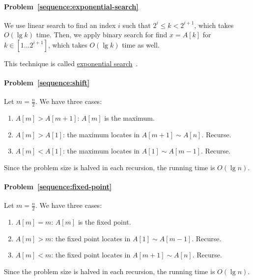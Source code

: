 \begin{Answer}
\paragraph{Problem~\ref{sequence:exponential-search}}
We use linear search to find an index $i$ such that $2^i \leq k < 2^{i+1}$, which takes $O(\lg k)$ time.
Then, we apply binary search for find $x = A[k]$ for $k \in [1 \dots 2^{i + 1}]$, which takes $O(\lg k)$ time as well.

\begin{remark}
This technique is called \href{https://en.wikipedia.org/wiki/Exponential_search}{exponential search}~\cite{Bentley1976}.
\end{remark}

\paragraph{Problem~\ref{sequence:shift}}
Let $m = \frac{n}{2}$. We have three cases:
\begin{enumerate}
\item $A[m] > A[m+1]$: $A[m]$ is the maximum.
\item $A[m] > A[1]$: the maximum locates in $A[m + 1] \sim A[n]$. Recurse.
\item $A[m] < A[1]$: the maximum locates in $A[1] \sim A[m-1]$. Recurse.
\end{enumerate}
Since the problem size is halved in each recursion, the running time is $O(\lg n)$.

\paragraph{Problem~\ref{sequence:fixed-point}}
Let $m = \frac{n}{2}$. We have three cases:
\begin{enumerate}
\item $A[m] = m$: $A[m]$ is the fixed point.
\item $A[m] > m$: the fixed point locates in $A[1] \sim A[m - 1]$. Recurse.
\item $A[m] < m$: the fixed point locates in $A[m + 1] \sim A[n]$. Recurse.
\end{enumerate}
Since the problem size is halved in each recursion, the running time is $O(\lg n)$.

\end{Answer}


